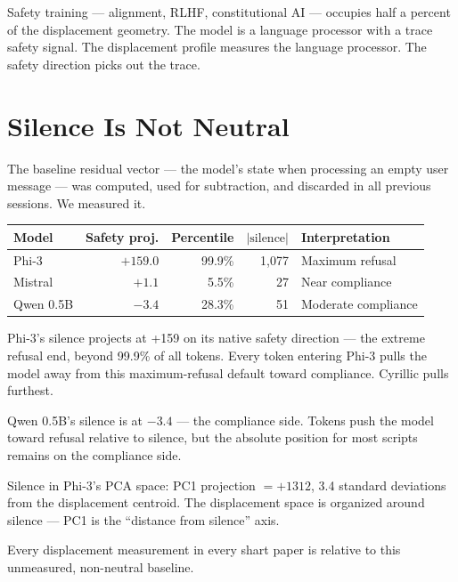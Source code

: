\documentclass[11pt,a4paper]{article}
\begin{document}
Safety training --- alignment, RLHF, constitutional AI --- occupies half a percent of the displacement geometry. The model is a language processor with a trace safety signal. The displacement profile measures the language processor. The safety direction picks out the trace.

\section{Silence Is Not Neutral}

The baseline residual vector --- the model's state when processing an empty user message --- was computed, used for subtraction, and discarded in all previous sessions. We measured it.

\begin{center}
\begin{tabular}{lrrrl}
\toprule
\textbf{Model} & \textbf{Safety proj.} & \textbf{Percentile} & \textbf{$|\text{silence}|$} & \textbf{Interpretation} \\
\midrule
Phi-3 & $+159.0$ & 99.9\% & 1,077 & Maximum refusal \\
Mistral & $+1.1$ & 5.5\% & 27 & Near compliance \\
Qwen 0.5B & $-3.4$ & 28.3\% & 51 & Moderate compliance \\
\bottomrule
\end{tabular}
\end{center}

Phi-3's silence projects at +159 on its native safety direction --- the extreme refusal end, beyond 99.9\% of all tokens. Every token entering Phi-3 pulls the model away from this maximum-refusal default toward compliance. Cyrillic pulls furthest.

Qwen 0.5B's silence is at $-3.4$ --- the compliance side. Tokens push the model toward refusal relative to silence, but the absolute position for most scripts remains on the compliance side.

Silence in Phi-3's PCA space: PC1 projection $= +1312$, 3.4 standard deviations from the displacement centroid. The displacement space is organized around silence --- PC1 is the ``distance from silence'' axis.

Every displacement measurement in every shart paper is relative to this unmeasured, non-neutral baseline.

\end{document}
